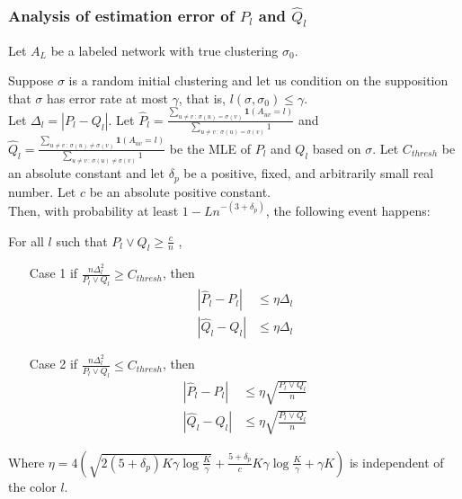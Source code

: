 \subsubsection{Analysis of estimation error of $\hat{P}_l$ and $\hat{Q}_l$}


\begin{proposition}
\label{prop:estimation_consistency}
Let $A_L$ be a labeled network with true clustering $\sigma_0$. 

Suppose $\sigma$ is a random initial clustering and let us condition on the supposition that $\sigma$ has error rate at most $\gamma$, that is, $l(\sigma, \sigma_0) \leq \gamma $. \\

Let $\Delta_l = | P_l - Q_l |$. Let $\hat{P}_l = \frac{\sum_{u \neq v \,:\, \sigma(u)=\sigma(v)} \mathbf{1}(A_{uv} = l) }
                      {\sum_{u \neq v \,:\, \sigma(u) = \sigma(v)} 1}$ and
    $\hat{Q}_l = \frac{\sum_{u \neq v \,:\, \sigma(u) \neq \sigma(v)} \mathbf{1}(A_{uv} = l) }
                      {\sum_{u \neq v \,:\, \sigma(u) \neq \sigma(v)} 1}$ be the MLE of $P_l$ and $Q_l$ based on $\sigma$. Let $C_{thresh}$ be an absolute constant and let $\delta_p$ be a positive, fixed, and arbitrarily small real number. Let $c$ be an absolute positive constant. \\

Then, with probability at least $1 - L n^{-(3 + \delta_p)}$, the following event happens:


For all $l$ such that $P_l \vee Q_l \geq \frac{c}{n}$ , 
\begin{itemize}
\item[Case 1] if $\frac{n \Delta_l^2}{P_l \vee Q_l} \geq C_{thresh}$, then
\begin{align*}
 | \hat{P}_l - P_l | &\leq \eta \Delta_l \\
 | \hat{Q}_l - Q_l | &\leq \eta \Delta_l 
\end{align*}
\item[Case 2] if $\frac{n \Delta_l^2}{P_l \vee Q_l} \leq C_{thresh}$, then
\begin{align*}
 | \hat{P}_l - P_l | &\leq \eta \sqrt{ \frac{P_l \vee Q_l}{n}} \\
 | \hat{Q}_l - Q_l | &\leq \eta \sqrt{ \frac{P_l \vee Q_l}{n}}
\end{align*}
\end{itemize}
Where $\eta = 4 \left( \sqrt{2 (5 + \delta_p) K \gamma \log \frac{K}{\gamma} } + \frac{5 + \delta_p}{c} K \gamma \log \frac{K}{\gamma} + \gamma K \right)$ is independent of the color $l$. 
\end{proposition}

